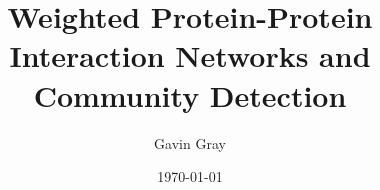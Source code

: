 \documentclass[12pt,oneside,abbrevs,dtc,mscres,neuro,notimes,logo]{styles/infthesis}
\title{Weighted Protein-Protein Interaction Networks and Community Detection}
\author{Gavin Gray}
\date{\today}
\begin{document}



  \begin{preliminary}
    \maketitle

    
    \standarddeclaration
    
    \tableofcontents
    \listoffigures
  \end{preliminary}

  
  
  
  
  

  \appendix

  
  
  

  \printbibliography
\end{document}
